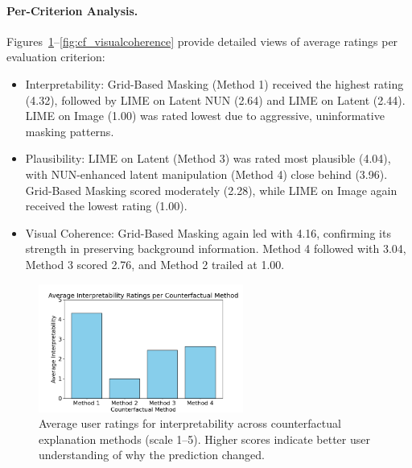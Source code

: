 \vspace{0.5em}
\paragraph{Per-Criterion Analysis.}
Figures~\ref{fig:cf_interpretability}--\ref{fig:cf_visualcoherence} provide detailed views of average ratings per evaluation criterion:

\begin{itemize}
    \item Interpretability: Grid-Based Masking (Method 1) received the highest rating (4.32), followed by LIME on Latent NUN (2.64) and LIME on Latent (2.44). LIME on Image (1.00) was rated lowest due to aggressive, uninformative masking patterns.
    \item Plausibility: LIME on Latent (Method 3) was rated most plausible (4.04), with NUN-enhanced latent manipulation (Method 4) close behind (3.96). Grid-Based Masking scored moderately (2.28), while LIME on Image again received the lowest rating (1.00).
    \item Visual Coherence: Grid-Based Masking again led with 4.16, confirming its strength in preserving background information. Method 4 followed with 3.04, Method 3 scored 2.76, and Method 2 trailed at 1.00.
\end{itemize}

\begin{figure}[h]
    \centering
    \includegraphics[width=0.6\textwidth]{img/human_rating_results/Interpretability_ratings.png}
    \caption[User-rated interpretability scores by method]{%
Average user ratings for interpretability across counterfactual explanation methods (scale 1–5). Higher scores indicate better user understanding of why the prediction changed.}
    \label{fig:cf_interpretability}
\end{figure}

